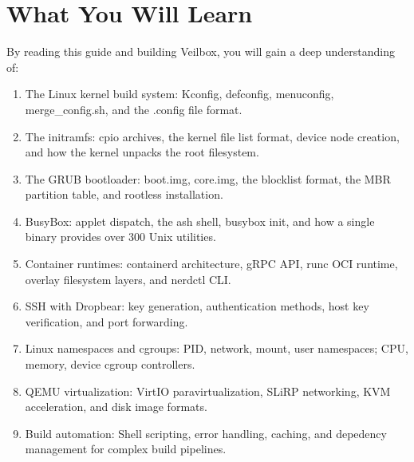 \section{What You Will Learn}

By reading this guide and building Veilbox, you will gain a deep
understanding of:

\begin{enumerate}[nosep]
  \item The Linux kernel build system: Kconfig, defconfig, menuconfig,
        merge\_config.sh, and the .config file format.
  \item The initramfs: cpio archives, the kernel file list format, device
        node creation, and how the kernel unpacks the root filesystem.
  \item The GRUB bootloader: boot.img, core.img, the blocklist format,
        the MBR partition table, and rootless installation.
  \item BusyBox: applet dispatch, the ash shell, busybox init, and how
        a single binary provides over 300 Unix utilities.
  \item Container runtimes: containerd architecture, gRPC API, runc OCI
        runtime, overlay filesystem layers, and nerdctl CLI.
  \item SSH with Dropbear: key generation, authentication methods, host
        key verification, and port forwarding.
  \item Linux namespaces and cgroups: PID, network, mount, user namespaces;
        CPU, memory, device cgroup controllers.
  \item QEMU virtualization: VirtIO paravirtualization, SLiRP networking,
        KVM acceleration, and disk image formats.
  \item Build automation: Shell scripting, error handling, caching, and
        depedency management for complex build pipelines.
\end{enumerate}
